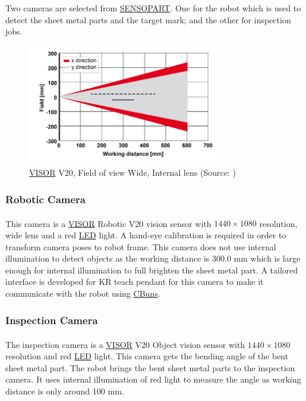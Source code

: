 Two cameras are selected from \hyperref[acro:SENSOPART]{SENSOPART}. One for the robot which is used to detect the sheet metal parts and the target mark; and the other for inspection jobs.

\begin{figure}[h]
    \centering
    \includegraphics[width=0.75\textwidth]{figures/visor-v20-fov.png}
    \caption{\hyperref[acro:VISOR]{VISOR}\textsuperscript{\textregistered} V20, Field of view Wide, Internal lens (Source: \cite[page 357]{visor_user_manual})}
    \label{fig:visor-v20}
\end{figure}


\subsubsection{Robotic Camera}
\label{subsubsec:robotic-camera}
This camera is a \hyperref[acro:VISOR]{VISOR}\textsuperscript{\textregistered} Robotic V20 vision sensor with $1440 \times 1080$ resolution, wide lens and a red \hyperref[acro:LED]{LED} light.
\cite{visor-robotic}
A hand-eye calibration is required in order to transform camera poses to robot frame. This camera does not use internal illumination to detect
objects as the working distance is 300.0 mm which is large enough for internal illumination to full brighten the sheet metal part.
A tailored interface is developed for KR teach pendant for this camera to make it communicate with the robot using \hyperref[acro:CBun]{CBuns}.

\subsubsection{Inspection Camera}
\label{subsubsec:inspection-camera}
The inspection camera is a \hyperref[acro:VISOR]{VISOR}\textsuperscript{\textregistered} V20 Object vision sensor with $1440 \times 1080$ resolution and red \hyperref[acro:LEDs]{LED} light.
\cite{visor-object}
This camera gets the bending angle
of the bent sheet metal part. The robot brings the bent sheet metal parts to the inspection camera. 
It uses internal illumination of red light to measure the angle as working distance is only around 100 mm. 